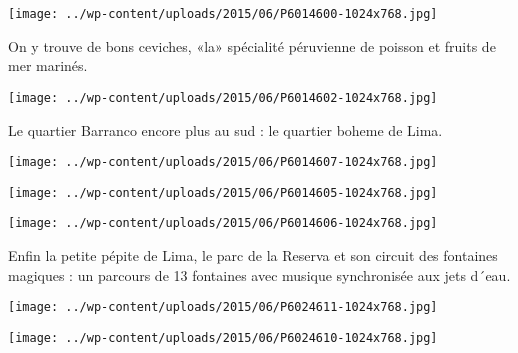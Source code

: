  

 

\begin{center} \texttt{[image: ../wp-content/uploads/2015/06/P6014600-1024x768.jpg]} \end{center}

 

 On y trouve de bons ceviches, «la» spécialité péruvienne de poisson et fruits de mer marinés. 

 

\begin{center} \texttt{[image: ../wp-content/uploads/2015/06/P6014602-1024x768.jpg]} \end{center}

 

 Le quartier Barranco encore plus au sud : le quartier boheme de Lima. 

 

\begin{center} \texttt{[image: ../wp-content/uploads/2015/06/P6014607-1024x768.jpg]} \end{center}

 

 

\begin{center} \texttt{[image: ../wp-content/uploads/2015/06/P6014605-1024x768.jpg]} \end{center}

 

 

\begin{center} \texttt{[image: ../wp-content/uploads/2015/06/P6014606-1024x768.jpg]} \end{center}

 

 Enfin la petite pépite de Lima, le parc de la Reserva et son circuit des fontaines magiques : un parcours de 13 fontaines avec musique synchronisée aux jets d´eau. 

 

\begin{center} \texttt{[image: ../wp-content/uploads/2015/06/P6024611-1024x768.jpg]} \end{center}

 

 

\begin{center} \texttt{[image: ../wp-content/uploads/2015/06/P6024610-1024x768.jpg]} \end{center}

